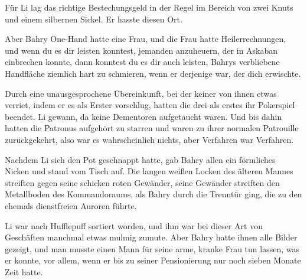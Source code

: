 Für Li lag das richtige Bestechungsgeld in der Regel im Bereich von zwei Knuts und einem silbernen Sickel. Er hasste diesen Ort.

Aber Bahry One-Hand hatte eine Frau, und die Frau hatte Heilerrechnungen, und wenn du es dir leisten konntest, jemanden anzuheuern, der in Askaban einbrechen konnte, dann konntest du es dir auch leisten, Bahrys verbliebene Handfläche ziemlich hart zu schmieren, wenn er derjenige war, der dich erwischte.

Durch eine unausgesprochene Übereinkunft, bei der keiner von ihnen etwas verriet, indem er es als Erster vorschlug, hatten die drei als erstes ihr Pokerspiel beendet. Li gewann, da keine Dementoren aufgetaucht waren. Und bis dahin hatten die Patronus aufgehört zu starren und waren zu ihrer normalen Patrouille zurückgekehrt, also war es wahrscheinlich nichts, aber Verfahren war Verfahren.

Nachdem Li sich den Pot geschnappt hatte, gab Bahry allen ein förmliches Nicken und stand vom Tisch auf. Die langen weißen Locken des älteren Mannes streiften gegen seine schicken roten Gewänder, seine Gewänder streiften den Metallboden des Kommandoraums, als Bahry durch die Trenntür ging, die zu den ehemals dienstfreien Auroren führte.

Li war nach Hufflepuff sortiert worden, und ihm war bei dieser Art von Geschäften manchmal etwas mulmig zumute. Aber Bahry hatte ihnen alle Bilder gezeigt, und man musste einen Mann für seine arme, kranke Frau tun lassen, was er konnte, vor allem, wenn er bis zu seiner Pensionierung nur noch sieben Monate Zeit hatte.


